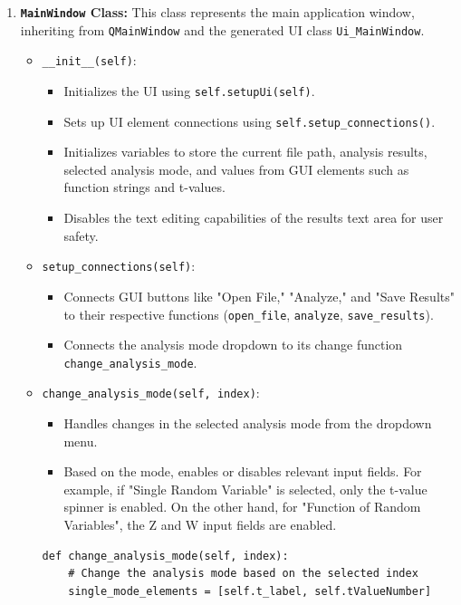 \documentclass{article}
\begin{document}
\begin{enumerate}
  \item \textbf{\texttt{MainWindow} Class:}
        This class represents the main application window, inheriting from \texttt{QMainWindow} and the generated UI class \texttt{Ui\_MainWindow}.
        \begin{itemize}
            \item \texttt{\_\_init\_\_(self)}:
            \begin{itemize}
              \item Initializes the UI using \texttt{self.setupUi(self)}.
              \item Sets up UI element connections using \texttt{self.setup\_connections()}.
              \item Initializes variables to store the current file path, analysis results, selected analysis mode, and values from GUI elements such as function strings and t-values.
              \item Disables the text editing capabilities of the results text area for user safety.
            \end{itemize}
            \item \texttt{setup\_connections(self)}:
            \begin{itemize}
              \item Connects GUI buttons like "Open File," "Analyze," and "Save Results" to their respective functions (\texttt{open\_file}, \texttt{analyze}, \texttt{save\_results}).
              \item Connects the analysis mode dropdown to its change function \texttt{change\_analysis\_mode}.
            \end{itemize}
            \item \texttt{change\_analysis\_mode(self, index)}:
             \begin{itemize}
              \item Handles changes in the selected analysis mode from the dropdown menu.
              \item Based on the mode, enables or disables relevant input fields. For example, if "Single Random Variable" is selected, only the t-value spinner is enabled. On the other hand, for "Function of Random Variables", the Z and W input fields are enabled.
            \end{itemize}
            \begin{verbatim}
def change_analysis_mode(self, index):
    # Change the analysis mode based on the selected index
    single_mode_elements = [self.t_label, self.tValueNumber]

\end{verbatim}
\end{itemize}
\end{enumerate}
\end{document}
